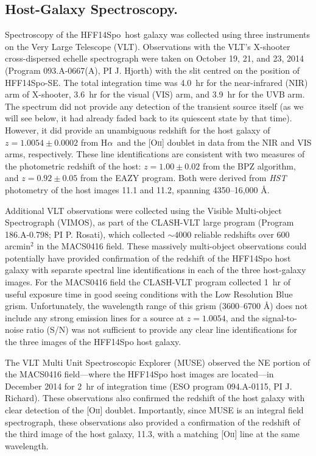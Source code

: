 \documentclass{article}
\providecommand\citep{\cite}
\def\Ha{\mbox{H$\alpha$}\xspace}
\newcommand\forbidden[2]{[#1{\scshape{#2}}]}
\def\HST{{\it HST}\xspace}
\def\spock{HFF14Spo\xspace}
\def\spocktwo{HFF14Spo-SE\xspace}
\def\macs0416{MACS0416\xspace}
\begin{document}
\subsection{Host-Galaxy Spectroscopy.}\label{sec:Spectroscopy}

Spectroscopy of the \spock\ host galaxy was collected using three
instruments on the Very Large Telescope (VLT).  Observations with the
VLT's X-shooter cross-dispersed echelle spectrograph\citep{Vernet:2011} were taken on October 19, 21, and 23, 2014
(Program 093.A-0667(A), PI J. Hjorth) with the slit centred on the
position of \spocktwo.  The total integration time was 4.0~hr for
the near-infrared (NIR) arm of X-shooter, 3.6~hr for the visual (VIS) 
arm, and 3.9~hr for
the UVB arm.  The spectrum did not provide any detection of the
transient source itself (as we will see below, it had already faded
back to its quiescent state by that time).  However, it did provide an
unambiguous redshift for the host galaxy of $z=1.0054\pm0.0002$ from
\Ha\ and the \forbidden{O}{ii} doublet in data from the NIR and VIS
arms, respectively.  These line identifications are consistent with
two measures of the photometric redshift of the host: $z=1.00\pm0.02$
from the BPZ algorithm\citep{Benitez:2000}, and $z=0.92\pm0.05$ from
the EAZY program\citep{Brammer:2008}.  Both were derived from \HST
photometry of the host images 11.1 and 11.2, spanning 4350--16,000 \AA.

Additional VLT observations were collected using the Visible
Multi-object Spectrograph (VIMOS)\citep{LeFevre:2003}, as part of the
CLASH-VLT large program (Program 186.A-0.798; PI
P. Rosati)\citep{Rosati:2014}, which collected $\sim4000$ reliable
redshifts over 600 arcmin$^2$ in the \macs0416
field\citep{Grillo:2015,Balestra:2016}.  These massively multi-object
observations could potentially have provided confirmation of the
redshift of the \spock host galaxy with separate spectral line
identifications in each of the three host-galaxy images.  For the
\macs0416 field the CLASH-VLT program collected 1~hr of useful
exposure time in good seeing conditions with the Low Resolution Blue
grism.  Unfortunately, the wavelength range of this grism (3600--6700
\AA) does not include any strong emission lines for a source at
$z=1.0054$, and the signal-to-noise ratio (S/N) was not sufficient to provide
any clear line identifications for the three images of the \spock host
galaxy.

The VLT Multi Unit Spectroscopic Explorer (MUSE)\citep{Henault:2003,Bacon:2012} observed the NE portion of
the MACS0416 field---where the \spock host images are located---in
December 2014 for 2~hr of integration time (ESO program
094.A-0115, PI J.\,Richard).  These observations also confirmed the
redshift of the host galaxy with clear detection of the
\forbidden{O}{ii} doublet.  Importantly, since MUSE is an integral
field spectrograph, these observations also provided a confirmation of
the redshift of the third image of the host galaxy, 11.3, with a
matching \forbidden{O}{ii} line at the same wavelength\cite{Caminha:2017}.
\end{document}
